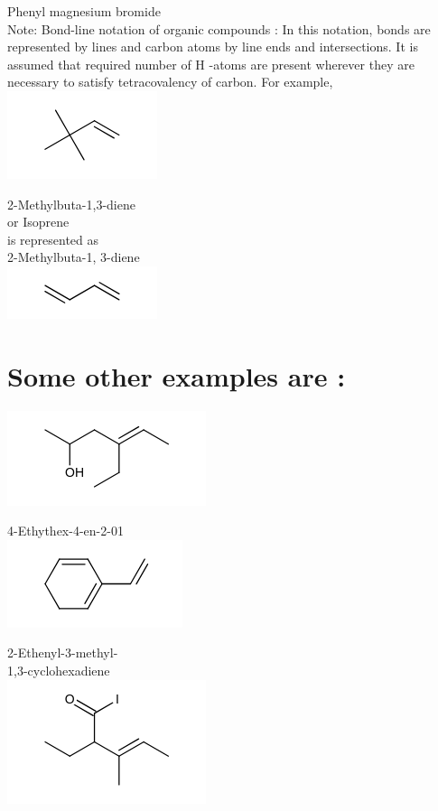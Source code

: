 \documentclass[10pt]{article}
\begin{document}
Phenyl magnesium bromide\\
Note: Bond-line notation of organic compounds : In this notation, bonds are represented by lines and carbon atoms by line ends and intersections. It is assumed that required number of H -atoms are present wherever they are necessary to satisfy tetracovalency of carbon. For example,\\
\includegraphics{smile-786b089dce36cf8277815dff4c51d5b445dd3840}

2-Methylbuta-1,3-diene\\
or Isoprene\\
is represented as\\
2-Methylbuta-1, 3-diene\\
\includegraphics{smile-eeee414a02eb52d3525bf2762938592e5f63d671}

\section*{Some other examples are :}
\includegraphics{smile-5296140b61b085ccee7c97f252c88be5e678043f}

4-Ethythex-4-en-2-01\\
\includegraphics{smile-4aad6562cc5e9ee9d916f3431d301d37086dbf2b}

2-Ethenyl-3-methyl-\\
1,3-cyclohexadiene\\
\includegraphics{smile-6bdc4b7df1703b5f3c52423fbc29cd9667692be1}
\end{document}
